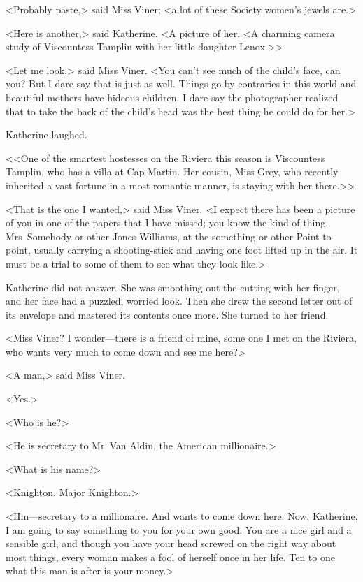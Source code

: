 <Probably paste,> said Miss Viner; <a lot of these Society women's jewels are.>

<Here is another,> said Katherine. <A picture of her, <A charming camera study of Viscountess Tamplin with her little daughter Lenox.>>

<Let me look,> said Miss Viner. <You can't see much of the child's face, can you? But I dare say that is just as well. Things go by contraries in this world and beautiful mothers have hideous children. I dare say the photographer realized that to take the back of the child's head was the best thing he could do for her.>

Katherine laughed.

<<One of the smartest hostesses on the Riviera this season is Viscountess Tamplin, who has a villa at Cap Martin. Her cousin, Miss Grey, who recently inherited a vast fortune in a most romantic manner, is staying with her there.>>

<That is the one I wanted,> said Miss Viner. <I expect there has been a picture of you in one of the papers that I have missed; you know the kind of thing. Mrs~Somebody or other Jones-Williams, at the something or other Point-to-point, usually carrying a shooting-stick and having one foot lifted up in the air. It must be a trial to some of them to see what they look like.>

Katherine did not answer. She was smoothing out the cutting with her finger, and her face had a puzzled, worried look. Then she drew the second letter out of its envelope and mastered its contents once more. She turned to her friend.

<Miss Viner? I wonder—there is a friend of mine, some one I met on the Riviera, who wants very much to come down and see me here?>

<A man,> said Miss Viner.

<Yes.>

<Who is he?>

<He is secretary to Mr~Van Aldin, the American millionaire.>

<What is his name?>

<Knighton. Major Knighton.>

<Hm—secretary to a millionaire. And wants to come down here. Now, Katherine, I am going to say something to you for your own good. You are a nice girl and a sensible girl, and though you have your head screwed on the right way about most things, every woman makes a fool of herself once in her life. Ten to one what this man is after is your money.>

